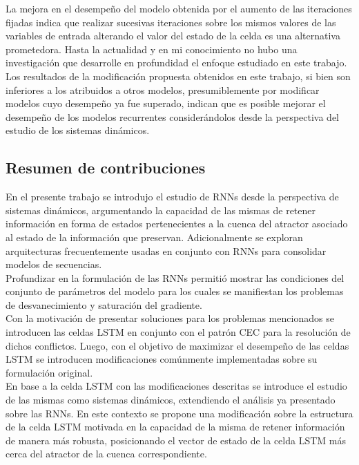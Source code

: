 \documentclass{article}
\begin{document}
	La mejora en el desempeño del modelo obtenida por el aumento de las iteraciones fijadas indica que realizar sucesivas iteraciones sobre los mismos valores de las variables de entrada alterando el valor del estado de la celda es una alternativa prometedora. Hasta la actualidad y en mi conocimiento no hubo una investigación que desarrolle en profundidad el enfoque estudiado en este trabajo.\\
	
	Los resultados de la modificación propuesta obtenidos en este trabajo, si bien son inferiores a los atribuidos a otros modelos\cite{14RegularizationZaremba}, presumiblemente por modificar modelos cuyo desempeño ya fue superado, indican que es posible mejorar el desempeño de los modelos recurrentes considerándolos desde la perspectiva del estudio de los sistemas dinámicos.
	
	\subsection{Resumen de contribuciones}
	En el presente trabajo se introdujo el estudio de RNNs desde la perspectiva de sistemas dinámicos, argumentando la capacidad de las mismas de retener información en forma de estados pertenecientes a la cuenca del atractor asociado al estado de la información que preservan. Adicionalmente se exploran arquitecturas frecuentemente usadas en conjunto con RNNs para consolidar modelos de secuencias. \\
	
	Profundizar en la formulación de las RNNs permitió mostrar las condiciones del conjunto de parámetros del modelo para los cuales se manifiestan los problemas de desvanecimiento y saturación del gradiente.\\
	Con la motivación de presentar soluciones para los problemas mencionados se introducen las celdas LSTM en conjunto con el patrón CEC para la resolución de dichos conflictos. Luego, con el objetivo de maximizar el desempeño de las celdas LSTM se introducen modificaciones comúnmente implementadas sobre su formulación original.\\
	
	En base a la celda LSTM con las modificaciones descritas se introduce el estudio de las mismas como sistemas dinámicos, extendiendo el análisis ya presentado sobre las RNNs. En este contexto se propone una modificación sobre la estructura de la celda LSTM motivada en la capacidad de la misma de retener información de manera más robusta, posicionando el vector de estado de la celda LSTM más cerca del atractor de la cuenca correspondiente.\\
	
\end{document}
